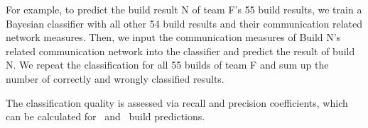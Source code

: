 For example, to predict the build result N of team F's 55 build results, we train
a Bayesian classifier with all other 54 build results and their communication
related network measures. Then, we input the communication measures of Build N's
related communication network into the classifier and predict the result of build
N. We repeat the classification for all 55 builds of team F and sum up the number
of correctly and wrongly classified results.



The classification quality is assessed via recall and precision coefficients,
which can be calculated for \error\ and \ok\ build  predictions. 
%
% 



